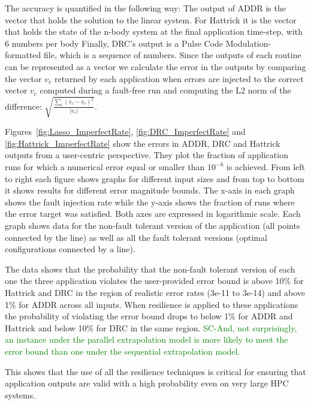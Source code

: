 \documentclass{sig-alternate}
\newcommand{\sui}[1]{%
  \textcolor{green}{SC-#1}
}
\begin{document}
The accuracy is quantified in the following way:
The output of ADDR is the vector that holds the solution to the linear system.
For Hattrick it is the vector that holds the state of the n-body system at the final application time-step, with 6 numbers per body
Finally, DRC's output is a Pulse Code Modulation-formatted file, which is a sequence of numbers.
Since the outputs of each routine can be represented as a vector we calculate the error in the outputs by comparing the vector $v_e$ returned by each application when errors are injected to the correct vector $v_c$ computed during a fault-free run and computing the L2 norm of the difference: $\sqrt{\frac{\sum_{i} (v_c-v_e)^2}{\left| v_c \right|}}$.

Figures~\ref{fig:Lasso_ImperfectRate}, \ref{fig:DRC_ImperfectRate} and \ref{fig:Hattrick_ImperfectRate} show the errors in ADDR, DRC and Hattrick outputs from a user-centric perspective.
They plot the fraction of application runs for which a numerical error equal or smaller than $10^{-8}$ is achieved.
From left to right each figure shows graphs for different input sizes and from top to bottom it shows results for different error magnitude bounds.
The x-axis in each graph shows the fault injection rate while the y-axis shows the fraction of runs where the error target was satisfied.
Both axes are expressed in logarithmic scale.
Each graph shows data for the non-fault tolerant version of the application (all points connected by the line) as well as all the fault tolerant versions (optimal configurations connected by a line).

The data shows that the probability that the non-fault tolerant version of each one the three application violates the user-provided error bound is above 10\% for Hattrick and DRC in the region of realistic error rates (3e-11 to 3e-14) and above 1\% for ADDR across all inputs.
When resilience is applied to these applications the probability of violating the error bound drops to below 1\% for ADDR and Hattrick and below 10\% for DRC in the same region.
\sui{And, not surprisingly, an instance under the parallel extrapolation model is more likely to meet the error bound than one under the sequential extrapolation model.}
This shows that the use of all the resilience techniques is critical for ensuring that application outputs are valid with a high probability even on very large HPC systems.
\end{document}
